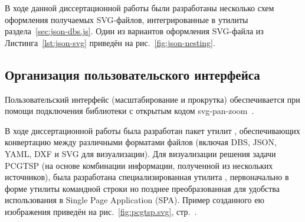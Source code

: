 В ходе данной диссертационной работы
были разработаны несколько схем
оформления получаемых SVG-файлов,
интегрированные в утилиты раздела~\ref{sec:json-dbs.js}.
Один из вариантов оформления
SVG-файла из Листинга~\ref{lst:json-svg}
приведён на рис.~\ref{fig:json-nesting}.

\subsection{Организация пользовательского интерфейса}

Пользовательский интерфейс
(масштабирование и прокрутка)
обеспечивается при помощи подключения
библиотеки с открытым кодом
svg-pan-zoom~\cite{bi:svg-pan-zoom}.

В ходе диссертационной работы
была разработан пакет утилит
\cite{bi:dbs2json},
обеспечивающих конвертацию между
различными форматами файлов
(включая DBS, JSON, YAML, DXF и SVG для визуализации).
Для визуализации решения задачи PCGTSP
(на основе комбинации информации,
полученной из нескольких источников),
была разработана специализированная утилита
\cite{bi:j2pcgtsp},
первоначально в форме утилиты командной строки
но позднее преобразованная
для удобства использования в
Single Page Application
(SPA).
Пример созданного ею изображения
приведён на рис.~\ref{fig:pcgtsp.svg},
стр.~\pageref{fig:pcgtsp.svg}.
